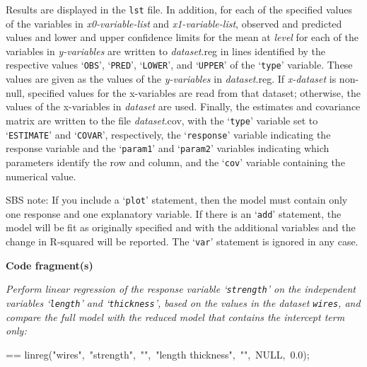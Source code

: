 \documentclass{book}
\makeatletter
\newcommand\Texinfocommandstyletextvar[1]{{\normalfont{}\textsl{#1}}}%
\newenvironment{Texinfopreformatted}{%
  \par\GNUTobeylines\obeyspaces\frenchspacing\parskip=\z@\parindent=\z@}{}
{\catcode`\^^M=13 \gdef\GNUTobeylines{\catcode`\^^M=13 \def^^M{\null\par}}}
\newenvironment{Texinfoindented}{\begin{list}{}{}\item\relax}{\end{list}}
\renewcommand{\_}{\Texinfounderscore\discretionary{}{}{}}
\makeatother
\begin{document}
Results are displayed in the \texttt{lst} file.
In addition, for each of the specified values of the variables in
\Texinfocommandstyletextvar{x0-variable-list} and \Texinfocommandstyletextvar{x1-variable-list},
observed and predicted values and lower and upper confidence limits
for the mean at \Texinfocommandstyletextvar{level} for each of the variables in
\Texinfocommandstyletextvar{y-variables} are written to \Texinfocommandstyletextvar{dataset}.reg
in lines identified by the respective values
`\texttt{OBS}', `\texttt{PRED}', `\texttt{LOWER}', and `\texttt{UPPER}' of the `\texttt{\_type\_}' variable.
These values are given as the values of the \Texinfocommandstyletextvar{y-variables} in \Texinfocommandstyletextvar{dataset}.reg.
If \Texinfocommandstyletextvar{x-dataset} is non-null, specified values for the x-variables
are read from that dataset; otherwise, the values of the x-variables in
\Texinfocommandstyletextvar{dataset} are used.
Finally,
the estimates and covariance matrix are written to the file \Texinfocommandstyletextvar{dataset}.cov,
with the `\texttt{\_type\_}' variable set to `\texttt{ESTIMATE}' and
`\texttt{COVAR}', respectively, the `\texttt{\_response\_}' variable indicating
the response variable and the `\texttt{\_param1\_}'
and `\texttt{\_param2\_}' variables indicating which parameters
identify the row and column, and the `\texttt{\_cov\_}' variable containing the numerical value.

SBS note: If you include a `\texttt{plot}' statement, then the model must contain
only one response and one explanatory variable. If there is an `\texttt{add}'
statement, the model will be fit as originally specified and with the
additional variables and the change in R-squared will be reported.
The `\texttt{var}' statement is ignored in any case.

\noindent{}\textbf{Code fragment(s)}

\emph{Perform linear regression of the response variable `\texttt{strength}'
on the independent variables `\texttt{length}' and `\texttt{thickness}', based
on the values in the dataset \texttt{wires}, and
compare the full model with the reduced model that contains the
intercept term only:}
\begin{Texinfoindented}
\begin{Texinfopreformatted}%
\ttfamily linreg("wires",\ "strength",\ "",\ "length thickness",\ "",\ NULL,\ 0.0);
\end{Texinfopreformatted}
\end{Texinfoindented}
\end{document}
